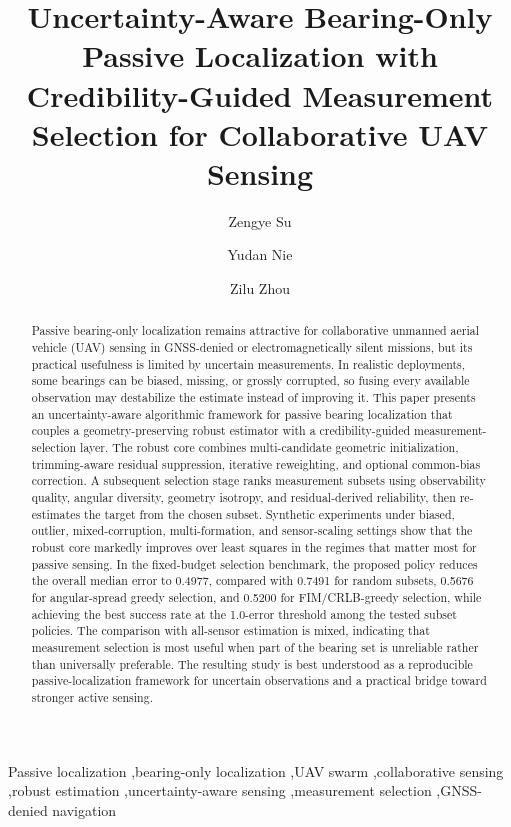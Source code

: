 \documentclass[preprint,12pt]{elsarticle}
\begin{document}
\begin{frontmatter}

\title{Uncertainty-Aware Bearing-Only Passive Localization with Credibility-Guided Measurement Selection for Collaborative UAV Sensing}

\author[inst1]{Zengye Su}
\author[inst1]{Yudan Nie}
\author[inst2]{Zilu Zhou}
\address[inst1]{Affiliation to be confirmed before submission}
\address[inst2]{Guangzhou College of Commerce, Guangzhou 511363, China}

\begin{abstract}
Passive bearing-only localization remains attractive for collaborative unmanned aerial vehicle (UAV) sensing in GNSS-denied or electromagnetically silent missions, but its practical usefulness is limited by uncertain measurements. In realistic deployments, some bearings can be biased, missing, or grossly corrupted, so fusing every available observation may destabilize the estimate instead of improving it. This paper presents an uncertainty-aware algorithmic framework for passive bearing localization that couples a geometry-preserving robust estimator with a credibility-guided measurement-selection layer. The robust core combines multi-candidate geometric initialization, trimming-aware residual suppression, iterative reweighting, and optional common-bias correction. A subsequent selection stage ranks measurement subsets using observability quality, angular diversity, geometry isotropy, and residual-derived reliability, then re-estimates the target from the chosen subset. Synthetic experiments under biased, outlier, mixed-corruption, multi-formation, and sensor-scaling settings show that the robust core markedly improves over least squares in the regimes that matter most for passive sensing. In the fixed-budget selection benchmark, the proposed policy reduces the overall median error to 0.4977, compared with 0.7491 for random subsets, 0.5676 for angular-spread greedy selection, and 0.5200 for FIM/CRLB-greedy selection, while achieving the best success rate at the 1.0-error threshold among the tested subset policies. The comparison with all-sensor estimation is mixed, indicating that measurement selection is most useful when part of the bearing set is unreliable rather than universally preferable. The resulting study is best understood as a reproducible passive-localization framework for uncertain observations and a practical bridge toward stronger active sensing.
\end{abstract}

\begin{keyword}
Passive localization \sep bearing-only localization \sep UAV swarm \sep collaborative sensing \sep robust estimation \sep uncertainty-aware sensing \sep measurement selection \sep GNSS-denied navigation
\end{keyword}

\end{frontmatter}
\end{document}
